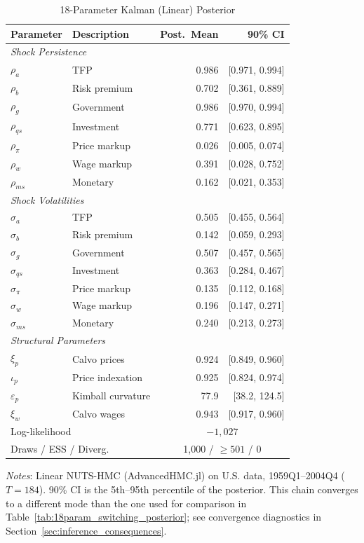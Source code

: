 \documentclass[12pt]{article}
\theoremstyle{plain}
\theoremstyle{definition}
\theoremstyle{remark}
\newcommand{\tablenotes}[1]{%
  \par\vspace{0.5em}%
  \noindent\begin{minipage}{\textwidth}%
  \raggedright\footnotesize #1%
  \end{minipage}\par%
}
\begin{document}
\begin{table}[htbp]
\centering
\caption{18-Parameter Kalman (Linear) Posterior}
\label{tab:18param_posterior}
\begin{tabular}{llrr}
\toprule
Parameter & Description & Post.\ Mean & 90\% CI \\
\midrule
\multicolumn{4}{l}{\textit{Shock Persistence}} \\
$\rho_a$ & TFP & 0.986 & [0.971, 0.994] \\
$\rho_b$ & Risk premium & 0.702 & [0.361, 0.889] \\
$\rho_g$ & Government & 0.986 & [0.970, 0.994] \\
$\rho_{qs}$ & Investment & 0.771 & [0.623, 0.895] \\
$\rho_\pi$ & Price markup & 0.026 & [0.005, 0.074] \\
$\rho_w$ & Wage markup & 0.391 & [0.028, 0.752] \\
$\rho_{ms}$ & Monetary & 0.162 & [0.021, 0.353] \\
\midrule
\multicolumn{4}{l}{\textit{Shock Volatilities}} \\
$\sigma_a$ & TFP & 0.505 & [0.455, 0.564] \\
$\sigma_b$ & Risk premium & 0.142 & [0.059, 0.293] \\
$\sigma_g$ & Government & 0.507 & [0.457, 0.565] \\
$\sigma_{qs}$ & Investment & 0.363 & [0.284, 0.467] \\
$\sigma_\pi$ & Price markup & 0.135 & [0.112, 0.168] \\
$\sigma_w$ & Wage markup & 0.196 & [0.147, 0.271] \\
$\sigma_{ms}$ & Monetary & 0.240 & [0.213, 0.273] \\
\midrule
\multicolumn{4}{l}{\textit{Structural Parameters}} \\
$\xi_p$ & Calvo prices & 0.924 & [0.849, 0.960] \\
$\iota_p$ & Price indexation & 0.925 & [0.824, 0.974] \\
$\varepsilon_p$ & Kimball curvature & 77.9 & [38.2, 124.5] \\
$\xi_w$ & Calvo wages & 0.943 & [0.917, 0.960] \\
\midrule
\multicolumn{2}{l}{Log-likelihood} & \multicolumn{2}{c}{$-1{,}027$} \\
\multicolumn{2}{l}{Draws / ESS / Diverg.} & \multicolumn{2}{c}{1,000 / $\geq 501$ / 0} \\
\bottomrule
\end{tabular}
\smallskip
\tablenotes{\textit{Notes}: Linear NUTS-HMC (AdvancedHMC.jl) on U.S. data, 1959Q1--2004Q4 ($T=184$). 90\% CI is the 5th--95th percentile of the posterior. This chain converges to a different mode than the one used for comparison in Table~\ref{tab:18param_switching_posterior}; see convergence diagnostics in Section~\ref{sec:inference_consequences}.}
\end{table}
\end{document}
